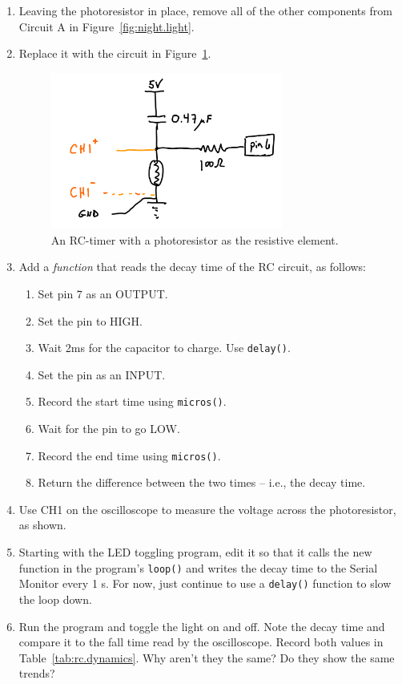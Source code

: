\documentclass[11pt]{article} %
\begin{document}
\begin{enumerate}
\item Leaving the photoresistor in place, remove all of the other components from Circuit A in Figure~\ref{fig:night.light}.
\item Replace it with the circuit in Figure~\ref{fig:rc.photoresistor}. 

\begin{figure}
\centering
\includegraphics[width=3in]{figures/RC_photoresistor.png}
\caption{An RC-timer with a photoresistor as the resistive element.}
\label{fig:rc.photoresistor}
\end{figure}

\item Add a \emph{function} that reads the decay time of the RC circuit, as follows:
\begin{enumerate}
\item Set pin 7 as an OUTPUT.
\item Set the pin to HIGH.
\item Wait 2ms for the capacitor to charge. Use \verb|delay()|.
\item Set the pin as an INPUT.
\item Record the start time using \verb|micros()|.
\item Wait for the pin to go LOW.
\item Record the end time using \verb|micros()|.
\item Return the difference between the two times -- i.e., the decay time.
\end{enumerate}
\item Use CH1 on the oscilloscope to measure the voltage across the photoresistor, as shown.
\item Starting with the LED toggling program, edit it so that it calls the new function in the program’s \verb|loop()| and writes the decay time to the Serial Monitor every 1 s. For now, just continue to use a \verb|delay()| function to slow the loop down.
\item Run the program and toggle the light on and off. Note the decay time and compare it to the fall time read by the oscilloscope. Record both values in Table~\ref{tab:rc.dynamics}. Why aren’t they the same? Do they show the same trends?


\end{enumerate}
\end{document}
